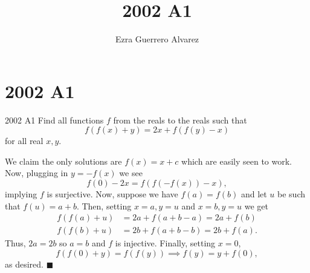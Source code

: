 \documentclass[14pt]{article}
\title{2002 A1}
\author{Ezra Guerrero Alvarez}
\begin{document}
\maketitle
	
\section*{2002 A1}

\begin{statement}{2002 A1}
	Find all functions $f$ from the reals to the reals such that
	\[ f\left(f(x)+y\right)=2x+f\left(f(y)-x\right) \]
	for all real $x,y$.
\end{statement}
We claim the only solutions are $f(x)=x+c$ which are easily seen to work. Now, plugging in $y=-f(x)$ we see
\[ f(0)-2x=f(f(-f(x))-x), \]
implying $f$ is surjective. Now, suppose we have $f(a)=f(b)$ and let $u$ be such that $f(u)=a+b$. Then, setting $x=a,y=u$ and $x=b,y=u$ we get
\begin{align*}
	f(f(a)+u)&=2a+f(a+b-a)=2a+f(b)\\
	f(f(b)+u)&=2b+f(a+b-b)=2b+f(a).
\end{align*}
Thus, $2a=2b$ so $a=b$ and $f$ is injective. Finally, setting $x=0$,
\[ f(f(0)+y)=f(f(y))\implies f(y)=y+f(0), \]
as desired. $\blacksquare$
	
\end{document}
